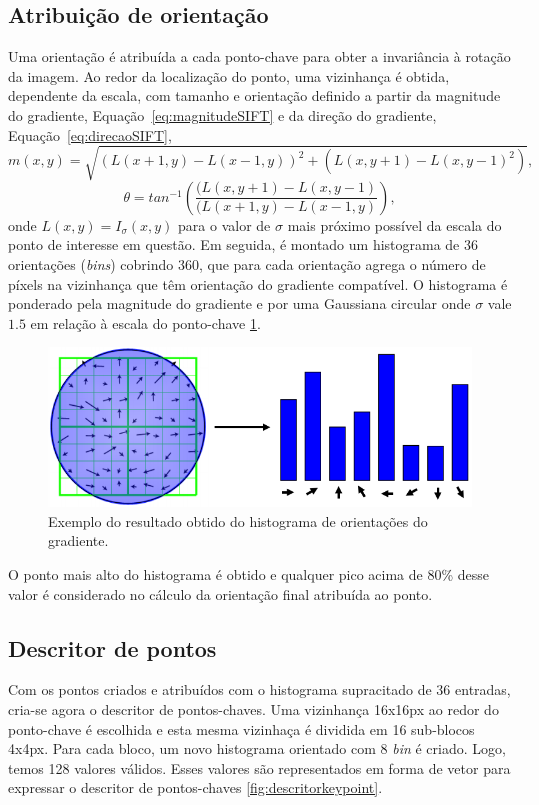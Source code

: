\subsection*{Atribuição de orientação}

Uma orientação é atribuída a cada ponto-chave para obter a invariância à rotação da imagem. 
Ao redor da localização do ponto, uma vizinhança é obtida, dependente da escala,
com tamanho e orientação definido a partir da magnitude do gradiente,
Equação~\ref{eq:magnitudeSIFT} e da direção do gradiente,
Equação~\ref{eq:direcaoSIFT}, 
\begin{equation}
	m(x,y) = \sqrt{(L(x+1,y)-L(x-1,y))^2 + (L(x,y+1)-L(x,y-1)^2)},
	\label{eq:magnitudeSIFT}
\end{equation}
\begin{equation}
	\theta = tan^{-1} \left(
  \frac{(L(x,y+1)-L(x,y-1)}{(L(x+1,y)-L(x-1,y)}\right),
	\label{eq:direcaoSIFT}
\end{equation}
onde $L(x,y) = I_\sigma(x,y)$ para o valor de $\sigma$ mais próximo possível da
escala do ponto de interesse em questão.  Em seguida, é montado um histograma de 36
orientações (\emph{bins}) cobrindo 360, que para cada orientação agrega o número
de píxels na vizinhança que têm orientação do gradiente compatível. O histograma é ponderado
pela magnitude do gradiente e por uma Gaussiana circular onde $\sigma$ vale
$1.5$ em relação à escala do ponto-chave \ref{fig:histogramaOrientado}.

\begin{figure} [!h]
	\centering
	\includegraphics[width=0.45\linewidth]{figs/histogramaOrientado.png}
	\caption{%
	Exemplo do resultado obtido do histograma de orientações do gradiente.
	}\label{fig:histogramaOrientado}
\end{figure}

O ponto mais alto do histograma é obtido e qualquer pico acima de 80\% desse
valor é considerado no cálculo da orientação final atribuída ao ponto. 

\subsection*{Descritor de pontos}

Com os pontos criados e atribuídos com o histograma 
supracitado de 36 entradas, cria-se agora o descritor de pontos-chaves.
Uma vizinhança 16x16px ao redor do ponto-chave é escolhida e esta mesma vizinhaça
é dividida em 16 sub-blocos 4x4px. Para cada bloco, um novo histograma orientado com 8
\emph{bin} é criado. Logo, temos 128 valores válidos. Esses valores são
representados em forma de vetor para expressar o descritor de pontos-chaves
\ref{fig:descritorkeypoint}.  

